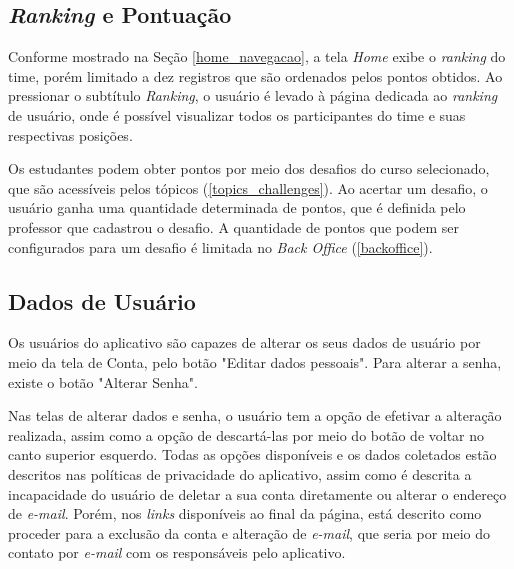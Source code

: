 \subsection{\textit{Ranking} e Pontuação}
\label{ranking}

Conforme mostrado na Seção \ref{home_navegacao}, a tela \textit{Home} exibe o \textit{ranking} do time, porém limitado a dez registros que são ordenados pelos pontos obtidos. Ao pressionar o subtítulo \textit{Ranking}, o usuário é levado à página dedicada ao \textit{ranking} de usuário, onde é possível visualizar todos os participantes do time e suas respectivas posições.


Os estudantes podem obter pontos por meio dos desafios do curso selecionado, que são acessíveis pelos tópicos (\ref{topics_challenges}). Ao acertar um desafio, o usuário ganha uma quantidade determinada de pontos, que é definida pelo professor que cadastrou o desafio. A quantidade de pontos que podem ser configurados para um desafio é limitada no \textit{Back Office} (\ref{backoffice}).

\subsection{Dados de Usuário}

Os usuários do aplicativo são capazes de alterar os seus dados de usuário por meio da tela de Conta, pelo botão "Editar dados pessoais". Para alterar a senha, existe o botão "Alterar Senha".


Nas telas de alterar dados e senha, o usuário tem a opção de efetivar a alteração realizada, assim como a opção de descartá-las por meio do botão de voltar no canto superior esquerdo. Todas as opções disponíveis e os dados coletados estão descritos nas políticas de privacidade do aplicativo, assim como é descrita a incapacidade do usuário de deletar a sua conta diretamente ou alterar o endereço de \textit{e-mail}. Porém, nos \textit{links} disponíveis ao final da página, está descrito como proceder para a exclusão da conta e alteração de \textit{e-mail}, que seria por meio do contato por \textit{e-mail} com os responsáveis pelo aplicativo.

